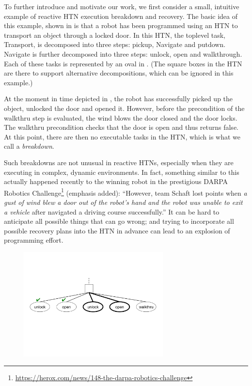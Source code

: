 \documentclass{llncs}
\begin{document}

\noindent To further introduce and motivate our work, we first
consider a small, intuitive example of reactive HTN execution
breakdown and recovery.  The basic idea of this example, shown in
 is that a robot has been programmed using an HTN to
transport an object through a locked door.  In this HTN, the toplevel
task, Transport, is decomposed into three steps: pickup, Navigate and
putdown.  Navigate is further decomposed into three steps: unlock,
open and walkthrough.  Each of these tasks is represented by an oval in
.  (The square boxes in the HTN are there to support
alternative decompositions, which can be ignored in this example.)

At the moment in time depicted in , the robot has
successfully picked up the object, unlocked the door and opened it.
However, before the precondition of the walkthru step is evaluated,
the wind blows the door closed and the door locks.  The walkthru
precondition checks that the door is open and thus returns false.  At
this point, there are then no executable tasks in the HTN, which is
what we call a \emph{breakdown}.

Such breakdowns are not unusual in reactive HTNs, especially when they
are executing in complex, dynamic environments. In fact, something
similar to this actually happened recently to the winning robot in the
prestigious DARPA Robotics Challenge\footnote{\url{https://herox.com/news/148-the-darpa-robotics-challenge}} (emphasis added):
``However, team Schaft lost points when \emph{a gust of wind blew a
  door out of the robot's hand and the robot was unable to exit a
  vehicle} after navigated a driving course successfully.''  It can be
hard to anticipate all possible things that can go wrong; and trying to
incorporate all possible recovery plans into the HTN in advance can
lead to an explosion of programming effort.

\begin{figure}[t]
\centerline{\includegraphics[width=3in]{figs/recover}}
\vskip 8pt
\end{figure}
\end{document}

